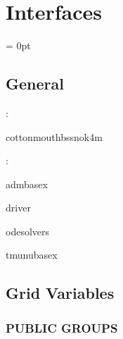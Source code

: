 
\section{Interfaces} 


\parskip = 0pt

\vspace{3mm} \subsection*{General}

: 

cottonmouthbssnok4m
\vspace{2mm}

: 

admbasex

driver

odesolvers

tmunubasex
\vspace{2mm}
\subsection*{Grid Variables}
\vspace{5mm}\subsubsection{PUBLIC GROUPS}

\vspace{5mm}

